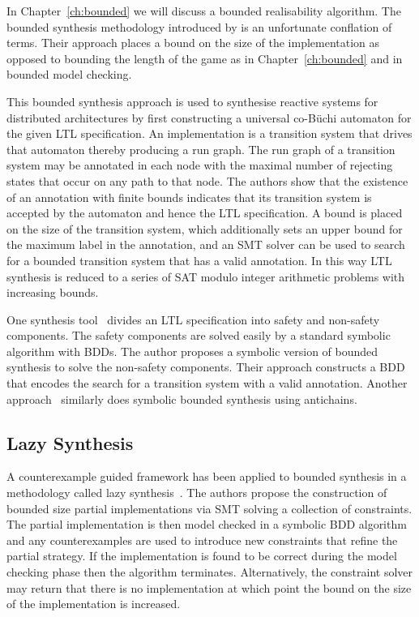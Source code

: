 In Chapter~\ref{ch:bounded} we will discuss a bounded realisability algorithm. The bounded synthesis methodology introduced by \cite{Finkbeiner13} is an unfortunate conflation of terms. Their approach places a bound on the size of the implementation as opposed to bounding the length of the game as in Chapter~\ref{ch:bounded} and in bounded model checking. 

This bounded synthesis approach is used to synthesise reactive systems for distributed architectures by first constructing a universal co-B\"uchi automaton for the given LTL specification. An implementation is a transition system that drives that automaton thereby producing a run graph. The run graph of a transition system may be annotated in each node with the maximal number of rejecting states that occur on any path to that node. The authors show that the existence of an annotation with finite bounds indicates that its transition system is accepted by the automaton and hence the LTL specification. A bound is placed on the size of the transition system, which additionally sets an upper bound for the maximum label in the annotation, and an SMT solver can be used to search for a bounded transition system that has a valid annotation. In this way LTL synthesis is reduced to a series of SAT modulo integer arithmetic problems with increasing bounds.

One synthesis tool~\cite{Ehlers12} divides an LTL specification into safety and non-safety components. The safety components are solved easily by a standard symbolic algorithm with BDDs. The author proposes a symbolic version of bounded synthesis to solve the non-safety components. Their approach constructs a BDD that encodes the search for a transition system with a valid annotation. Another approach~\cite{Filiot11} similarly does symbolic bounded synthesis using antichains.

\subsection{Lazy Synthesis}

A counterexample guided framework has been applied to bounded synthesis in a methodology called lazy synthesis~\cite{Finkbeiner12}. The authors propose the construction of bounded size partial implementations via SMT solving a collection of constraints. The partial implementation is then model checked in a symbolic BDD algorithm and any counterexamples are used to introduce new constraints that refine the partial strategy. If the implementation is found to be correct during the model checking phase then the algorithm terminates. Alternatively, the constraint solver may return that there is no implementation at which point the bound on the size of the implementation is increased. 

